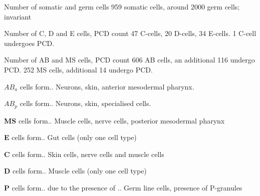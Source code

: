 
\begin{flashcard}{Number of somatic and germ cells}
    959 somatic cells, around 2000 germ cells; invariant
\end{flashcard}

\begin{flashcard}{Number of C, D and E cells, PCD count}
    47 C-cells, 20 D-cells, 34 E-cells. 1 C-cell undergoes PCD.
\end{flashcard}

\begin{flashcard}{Number of AB and MS cells, PCD count}
    606 AB cells, an additional 116 undergo PCD. 252 MS cells, additional 14 undergo PCD. 
\end{flashcard}

\begin{flashcard}{$AB_a$ cells form..}
    Neurons, skin, anterior mesodermal pharynx. 
\end{flashcard}

\begin{flashcard}{$AB_p$ cells form..}
    Neurons, skin, specialised cells. 
\end{flashcard}

\begin{flashcard}{\textbf{MS} cells form..}
    Muscle cells, nerve cells, posterior mesodermal pharynx
\end{flashcard}

\begin{flashcard}{\textbf{E} cells form..}
    Gut cells (only one cell type)
\end{flashcard}

\begin{flashcard}{\textbf{C} cells form..}
    Skin cells, nerve cells and muscle cells
\end{flashcard}

\begin{flashcard}{\textbf{D} cells form..}
    Muscle cells (only one cell type)
\end{flashcard}

\begin{flashcard}{\textbf{P} cells form.. due to the presence of .. }
    Germ line cells, presence of P-granules
\end{flashcard}

